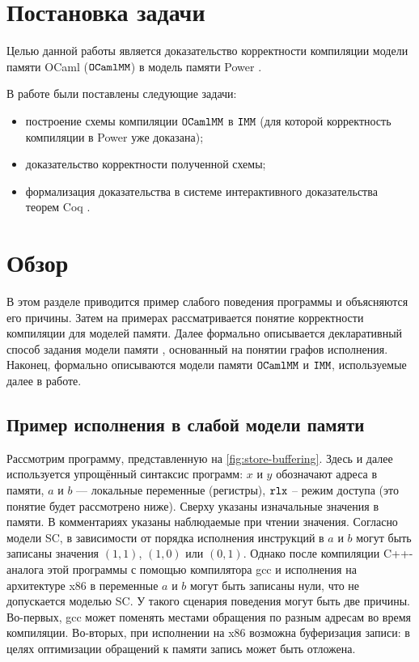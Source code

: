 \section{Постановка задачи}

Целью данной работы является доказательство корректности компиляции модели памяти OCaml ($\mathtt{OCaml}\allowbreak \mathtt{MM}$) в модель памяти Power \cite{power}. 

В работе были поставлены следующие задачи:

\begin{itemize}
\item построение схемы компиляции $\mathtt{OCaml}\allowbreak \mathtt{MM}$ в $\mathtt{IMM}$ (для которой корректность компиляции в Power уже доказана);
\item доказательство корректности полученной схемы;
\item формализация доказательства в системе интерактивного доказательства теорем Coq \cite{coq-description}.
\end{itemize}

\section{Обзор}

В этом разделе приводится пример слабого поведения программы и объясняются его причины. Затем на примерах рассматривается понятие корректности компиляции для моделей памяти. Далее формально описывается декларативный способ задания модели памяти \cite{power}, основанный на понятии графов исполнения. Наконец, формально описываются модели памяти $\mathtt{OCaml}\allowbreak \mathtt{MM}$ и $\mathtt{IMM}$, используемые далее в работе.

\subsection{Пример исполнения в слабой модели памяти}

Рассмотрим программу, представленную на \cref{fig:store-buffering}. Здесь и далее используется упрощённый синтаксис программ: $x$ и $y$ обозначают адреса в памяти, $a$ и $b$ — локальные переменные (регистры), $\mathtt{rlx}$ – режим доступа (это понятие будет рассмотрено ниже). Сверху указаны изначальные значения в памяти. В комментариях указаны наблюдаемые при чтении значения. Согласно модели SC, в зависимости от порядка исполнения инструкций в $a$ и $b$ могут быть записаны значения $(1, 1)$, $(1, 0)$ или $(0, 1)$. Однако после компиляции C++-аналога этой программы с помощью компилятора gcc и исполнения на архитектуре x86 в переменные $a$ и $b$ могут быть записаны нули, что не допускается моделью SC. У такого сценария поведения могут быть две причины. Во-первых, gcc может поменять местами обращения по разным адресам во время компиляции. Во-вторых, при исполнении на x86 возможна буферизация записи: в целях оптимизации обращений к памяти запись может быть отложена. 


